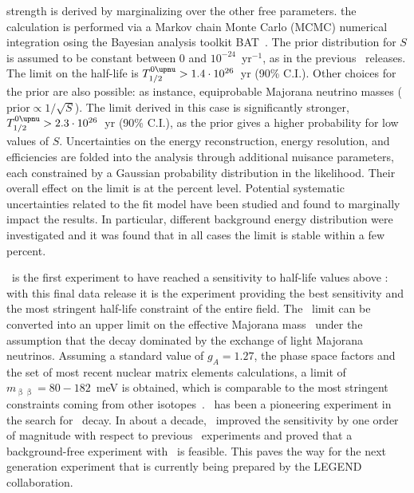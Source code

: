 strength is derived by marginalizing over the other free parameters. the calculation is
performed via a Markov chain Monte Carlo (MCMC) numerical integration osing the Bayesian
analysis toolkit BAT~\cite{Caldwell2008}. The prior distribution for $S$ is assumed to be
constant between 0 and $10^{-24}$~yr$^{-1}$, as in the previous \gerda\ releases. The
limit on the half-life is $\thalfzeroM > 1.4 \cdot 10^{26}$~yr (90\% C.I.). Other choices
for the prior are also possible: as instance, equiprobable Majorana neutrino masses
($\text{prior} \propto 1/\sqrt{S}$). The limit derived in this case is significantly
stronger, $\thalfzeroM > 2.3 \cdot 10^{26}$~yr (90\% C.I.), as the prior gives a higher
probability for low values of $S$.
\newpar
Uncertainties on the energy reconstruction, energy resolution, and efficiencies are folded
into the analysis through additional nuisance parameters, each constrained by a Gaussian
probability distribution in the likelihood. Their overall effect on the limit is at the
percent level. Potential systematic uncertainties related to the fit model have been
studied and found to marginally impact the results. In particular, different background
energy distribution were investigated and it was found that in all cases the limit is
stable within a few percent.

\gerda\ is the first experiment to have reached a sensitivity to half-life values above
: with this final data release it is the experiment providing the best
sensitivity and the most stringent half-life constraint of the entire field.
\newpar
The \thalfzero\ limit can be converted into an upper limit on the effective Majorana mass
\mbb\ under the assumption that the decay dominated by the exchange of light Majorana
neutrinos. Assuming a standard value of $g_A = 1.27$, the phase space factors and the set
of most recent nuclear matrix elements calculations, a limit of $m_{\upbeta\upbeta} = 80 -
182$~meV is obtained, which is comparable to the most stringent constraints coming from
other isotopes~\cite{Anton2019, Gando2016, Adams2019}. \gerda\ has been a pioneering
experiment in the search for \onbb\ decay.  In about a decade, \gerda\ improved the
sensitivity by one order of magnitude with respect to previous \gesix\ experiments and
proved that a background-free experiment with \gesix\ is feasible. This paves the way for
the next generation experiment that is currently being prepared by the LEGEND
collaboration.


